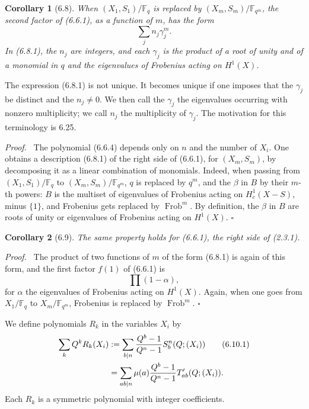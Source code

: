 \documentclass[10pt]{article}
\newcommand{\Fq}{\mathbb F_q}
\newcommand{\Fb}{\mathbb F}
\newcommand{\Frob}{\operatorname{Frob}}
\theoremstyle{deligne}
\newtheorem*{corollary*}{Corollary}
\newenvironment{proofdel}[1][Proof.]{\textit{#1}\ }{\hfill$\square$}
\newcommand{\heading}[1]{\vspace{0.7em}\noindent{\bfseries #1}\quad}
\begin{document}
\begin{corollary*}[6.8]
When $(X_1,S_1)/\Fq$ is replaced by $(X_m,S_m)/\Fb_{q^m}$, the second factor of (6.6.1), as a function of $m$, has the form
\begin{equation}\tag{6.8.1}
\sum_j n_j\gamma_j^m.
\end{equation}
In (6.8.1), the $n_j$ are integers, and each $\gamma_j$ is the product of a root of unity and of a monomial in $q$ and the eigenvalues of Frobenius acting on $H^1(X)$.
\end{corollary*}
The expression (6.8.1) is not unique. It becomes unique if one imposes that the $\gamma_j$ be distinct and the $n_j\ne0$. We then call the $\gamma_j$ the eigenvalues occurring with nonzero multiplicity; we call $n_j$ the multiplicity of $\gamma_j$. The motivation for this terminology is 6.25.

\begin{proofdel}
The polynomial (6.6.4) depends only on $n$ and the number of $X_i$. One obtains a description (6.8.1) of the right side of (6.6.1), for $(X_m,S_m)$, by decomposing it as a linear combination of monomials. Indeed, when passing from $(X_1,S_1)/\Fq$ to $(X_m,S_m)/\Fb_{q^m}$, $q$ is replaced by $q^m$, and the $\beta$ in $B$ by their $m$-th powers: $B$ is the multiset of eigenvalues of Frobenius acting on $H^1_c(X-S)$, minus $\{1\}$, and Frobenius gets replaced by $\Frob^m$. By definition, the $\beta$ in $B$ are roots of unity or eigenvalues of Frobenius acting on $H^1(X)$.
\end{proofdel}

\begin{corollary*}[6.9]
The same property holds for (6.6.1), the right side of (2.3.1).
\end{corollary*}
\begin{proofdel}
The product of two functions of $m$ of the form (6.8.1) is again of this form, and the first factor $f(1)$ of (6.6.1) is
\[
\prod(1-\alpha),
\]
for $\alpha$ the eigenvalues of Frobenius acting on $H^1(X)$. Again, when one goes from $X_1/\Fq$ to $X_m/\Fb_{q^m}$, Frobenius is replaced by $\Frob^m$.
\end{proofdel}

\heading{6.10.} We define polynomials $R_k$ in the variables $X_i$ by
\begin{align}
\sum_k Q^kR_k(X_i)&:=\sum_{b\mid n}\frac{Q^b-1}{Q^n-1}S_b^n(Q;(X_i))\tag{6.10.1}\\
&=\sum_{ab\mid n}\mu(a)\frac{Q^b-1}{Q^n-1}T'_{ab}(Q;(X_i)).\notag
\end{align}
Each $R_k$ is a symmetric polynomial with integer coefficients.
\end{document}
